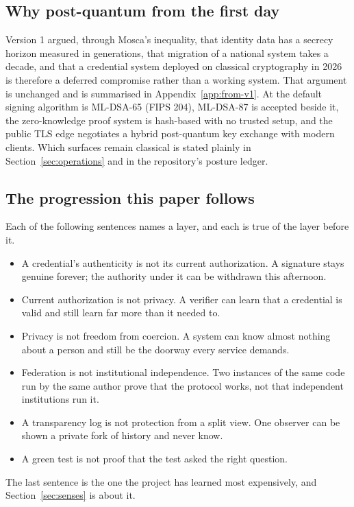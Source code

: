\subsection{Why post-quantum from the first day}

Version 1 argued, through Mosca's inequality, that identity data has a secrecy horizon measured in
generations, that migration of a national system takes a decade, and that a credential system
deployed on classical cryptography in 2026 is therefore a deferred compromise rather than a working
system. That argument is unchanged and is summarised in Appendix~\ref{app:from-v1}. At 
the default signing algorithm is ML-DSA-65 (FIPS 204), ML-DSA-87 is accepted beside it, the zero-knowledge
proof system is hash-based with no trusted setup, and the public TLS edge negotiates a hybrid
post-quantum key exchange with modern clients. Which surfaces remain classical is stated plainly in
Section~\ref{sec:operations} and in the repository's posture ledger.

\subsection{The progression this paper follows}

Each of the following sentences names a layer, and each is true of the layer before it.

\begin{itemize}
  \item A credential's authenticity is not its current authorization. A signature stays genuine
    forever; the authority under it can be withdrawn this afternoon.
  \item Current authorization is not privacy. A verifier can learn that a credential is valid and
    still learn far more than it needed to.
  \item Privacy is not freedom from coercion. A system can know almost nothing about a person and
    still be the doorway every service demands.
  \item Federation is not institutional independence. Two instances of the same code run by the
    same author prove that the protocol works, not that independent institutions run it.
  \item A transparency log is not protection from a split view. One observer can be shown a private
    fork of history and never know.
  \item A green test is not proof that the test asked the right question.
\end{itemize}

The last sentence is the one the project has learned most expensively, and Section~\ref{sec:senses}
is about it.
